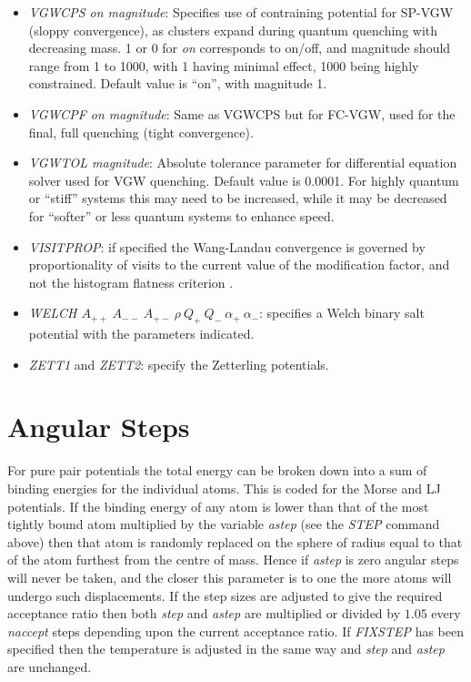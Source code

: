 \documentclass[12pt,a4paper,dvips]{article}
\begin{document}
\begin{itemize}
\item{\it VGWCPS on magnitude}: Specifies use of contraining potential for SP-VGW (sloppy convergence), as clusters expand during quantum quenching
with decreasing mass. 1 or 0 for {\it on} corresponds to on/off,
and magnitude should range from 1 to 1000, with 1 having minimal effect, 1000 being highly constrained. Default value is ``on'', with magnitude 1.

\item{\it VGWCPF on magnitude}: Same as VGWCPS but for FC-VGW, used for the final, full quenching (tight convergence).

\item{\it VGWTOL magnitude}: Absolute tolerance parameter for differential equation solver used for VGW quenching. Default value is 0.0001.
For highly quantum or ``stiff'' systems this may need to be increased, while it may be decreased for ``softer'' or less quantum systems to enhance
speed.
 
\item {\it VISITPROP}: if specified the Wang-Landau convergence is governed by proportionality of visits to the current value of
the modification factor, and not the histogram flatness criterion \cite{ZhouB03}.

\item {\it WELCH $A_{++}\ A_{--}\ A_{+-}\ \rho\ Q_+\ Q_-\ \alpha_+\ \alpha_-$\/}: specifies a Welch binary
salt potential with the parameters indicated.

\item {\it ZETT1\/} and {\it ZETT2\/}: specify the Zetterling potentials.
\end{itemize}

\section{Angular Steps}

For pure pair potentials the total energy can be broken down into a sum of binding
energies for the individual atoms. This is coded for the Morse and LJ potentials.
If the binding energy of any atom is lower than that of the most tightly bound atom
multiplied by the variable {\it astep\/} (see the {\it STEP\/} command above) then
that atom is randomly replaced on the sphere of radius equal to that of the atom furthest
from the centre of mass. Hence if {\it astep\/} is zero angular steps will never be taken,
and the closer this parameter is to one the more atoms will undergo such displacements.
If the step sizes are adjusted to give the required acceptance ratio then both {\it step\/} and
{\it astep\/} are multiplied or divided by $1.05$ every {\it naccept\/} steps depending
upon the current acceptance ratio. If {\it FIXSTEP\/} has been specified then the temperature
is adjusted in the same way and {\it step\/} and {\it astep\/} are unchanged.
\end{document}
